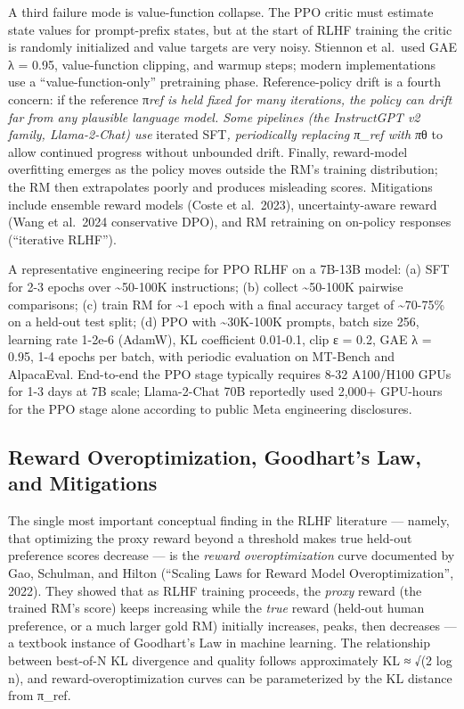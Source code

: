 \documentclass{article}
\begin{document}
A third failure mode is value-function collapse. The PPO critic must estimate state values for prompt-prefix states, but at the start of RLHF training the critic is randomly initialized and value targets are very noisy. Stiennon et al.~used GAE λ = 0.95, value-function clipping, and warmup steps; modern implementations use a ``value-function-only'' pretraining phase. Reference-policy drift is a fourth concern: if the reference π\emph{ref is held fixed for many iterations, the policy can drift far from any plausible language model. Some pipelines (the InstructGPT v2 family, Llama-2-Chat) use }iterated SFT\emph{, periodically replacing π\_ref with π}θ to allow continued progress without unbounded drift. Finally, reward-model overfitting emerges as the policy moves outside the RM's training distribution; the RM then extrapolates poorly and produces misleading scores. Mitigations include ensemble reward models (Coste et al.~2023), uncertainty-aware reward (Wang et al.~2024 conservative DPO), and RM retraining on on-policy responses (``iterative RLHF'').

A representative engineering recipe for PPO RLHF on a 7B-13B model: (a) SFT for 2-3 epochs over \textasciitilde50-100K instructions; (b) collect \textasciitilde50-100K pairwise comparisons; (c) train RM for \textasciitilde1 epoch with a final accuracy target of \textasciitilde70-75\% on a held-out test split; (d) PPO with \textasciitilde30K-100K prompts, batch size 256, learning rate 1-2e-6 (AdamW), KL coefficient 0.01-0.1, clip ε = 0.2, GAE λ = 0.95, 1-4 epochs per batch, with periodic evaluation on MT-Bench and AlpacaEval. End-to-end the PPO stage typically requires 8-32 A100/H100 GPUs for 1-3 days at 7B scale; Llama-2-Chat 70B reportedly used 2,000+ GPU-hours for the PPO stage alone according to public Meta engineering disclosures.

\subsection{Reward Overoptimization, Goodhart's Law, and Mitigations}\label{reward-overoptimization-goodharts-law-and-mitigations}

The single most important conceptual finding in the RLHF literature --- namely, that optimizing the proxy reward beyond a threshold makes true held-out preference scores decrease --- is the \emph{reward overoptimization} curve documented by Gao, Schulman, and Hilton (``Scaling Laws for Reward Model Overoptimization'', 2022). They showed that as RLHF training proceeds, the \emph{proxy} reward (the trained RM's score) keeps increasing while the \emph{true} reward (held-out human preference, or a much larger gold RM) initially increases, peaks, then decreases --- a textbook instance of Goodhart's Law in machine learning. The relationship between best-of-N KL divergence and quality follows approximately KL ≈ √(2 log n), and reward-overoptimization curves can be parameterized by the KL distance from π\_ref.
\end{document}
